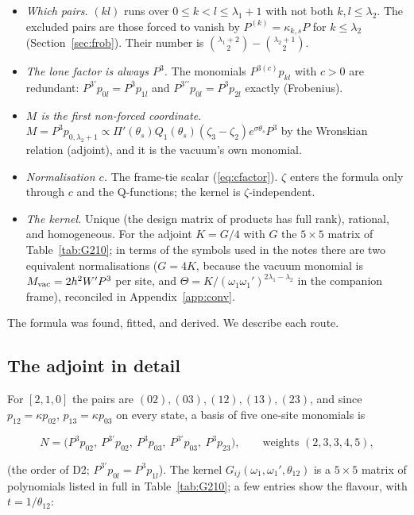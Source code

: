 \documentclass[11pt]{article}
\begin{document}
\begin{itemize}
\item \emph{Which pairs.} $(kl)$ runs over $0\le k<l\le\lambda_1+1$ with not both $k,l\le\lambda_2$. The excluded pairs are those forced to vanish by $P^{(k)}=\kappa_{k,s}P$ for $k\le\lambda_2$ (Section~\ref{sec:frob}).
Their number is $\binom{\lambda_1+2}2-\binom{\lambda_2+1}2$.
\item \emph{The lone factor is always $P^3$.} The monomials $P^{3(c)}p_{kl}$ with $c>0$ are redundant: $P^{3\prime}p_{0l}=P^3p_{1l}$ and $P^{3\prime\prime}p_{0l}=P^3p_{2l}$ exactly (Frobenius).
\item \emph{$M$ is the first non-forced coordinate.} $M=P^3p_{0,\lambda_2+1}\propto\Pi'(\theta_s)Q_1(\theta_s)(\zeta_3-\zeta_2)e^{\sigma\theta_s}P^3$ by the Wronskian relation (adjoint), and it is the vacuum's own monomial.
\item \emph{Normalisation $c$.} The frame-tie scalar (\ref{eq:cfactor}). $\zeta$ enters the formula only through $c$ and the Q-functions; the kernel is $\zeta$-independent.
\item \emph{The kernel.} Unique (the design matrix of products has full rank), rational, and homogeneous.
For the adjoint $K=G/4$ with $G$ the $5\times5$ matrix of Table~\ref{tab:G210}; in terms of the symbols used in the notes there are two equivalent normalisations ($G=4K$, because the vacuum monomial is $M_{\rm vac}=2h^2W'P^3$ per site, and $\Theta=K/(\omega_1\omega_1')^{2\lambda_1-\lambda_2}$ in the companion frame), reconciled in Appendix~\ref{app:conv}.
\end{itemize}

The formula was found, fitted, and derived.
We describe each route.

\subsection{The adjoint in detail}\label{sec:adjoint}

For $[2,1,0]$ the pairs are $(02),(03),(12),(13),(23)$, and since $p_{12}=\kappa p_{02}$, $p_{13}=\kappa p_{03}$ on every state, a basis of five one-site monomials is

\begin{equation}
N=\bigl(P^3p_{02},\ P^{3\prime}p_{02},\ P^3p_{03},\ P^{3\prime}p_{03},\ P^3p_{23}\bigr),\qquad\text{weights }(2,3,3,4,5),\label{eq:N5}
\end{equation}

(the order of D2; $P^{3\prime}p_{0l}=P^3p_{1l}$).
The kernel $G_{ij}(\omega_1,\omega_1',\theta_{12})$ is a $5\times5$ matrix of polynomials listed in full in Table~\ref{tab:G210}; a few entries show the flavour, with $t=1/\theta_{12}$:
\end{document}
